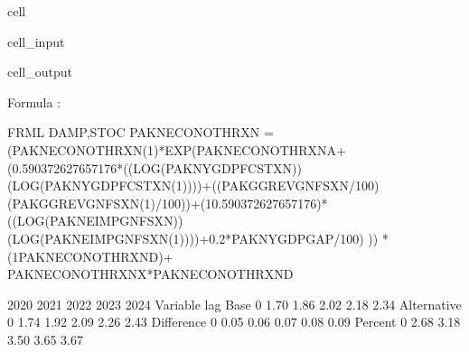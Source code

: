\documentclass[letterpaper,10pt,english]{jupyterBook}
\begin{document}
\begin{sphinxuseclass}{cell}\begin{sphinxVerbatimInput}

\begin{sphinxuseclass}{cell_input}
\begin{sphinxVerbatim}[commandchars=\\\{\}]
\PYG{p}{[}\PYG{p}{]}
\end{sphinxVerbatim}

\end{sphinxuseclass}\end{sphinxVerbatimInput}
\begin{sphinxVerbatimOutput}

\begin{sphinxuseclass}{cell_output}
\begin{sphinxVerbatim}[commandchars=\\\{\}]
Formula        :
\end{sphinxVerbatim}

\begin{sphinxVerbatim}[commandchars=\\\{\}]
 FRML \PYGZlt{}DAMP,STOC\PYGZgt{} PAKNECONOTHRXN = (PAKNECONOTHRXN(\PYGZhy{}1)*EXP(PAKNECONOTHRXN\PYGZus{}A+ (0.590372627657176*((LOG(PAKNYGDPFCSTXN))\PYGZhy{}(LOG(PAKNYGDPFCSTXN(\PYGZhy{}1))))+((PAKGGREVGNFSXN/100)\PYGZhy{}(PAKGGREVGNFSXN(\PYGZhy{}1)/100))+(1\PYGZhy{}0.590372627657176)*((LOG(PAKNEIMPGNFSXN))\PYGZhy{}(LOG(PAKNEIMPGNFSXN(\PYGZhy{}1))))+0.2*PAKNYGDPGAP\PYGZus{}/100) )) * (1\PYGZhy{}PAKNECONOTHRXN\PYGZus{}D)+ PAKNECONOTHRXN\PYGZus{}X*PAKNECONOTHRXN\PYGZus{}D  \PYGZdl{} 

                      2020       2021       2022       2023       2024
Variable    lag                                                       
Base        0         1.70       1.86       2.02       2.18       2.34
Alternative 0         1.74       1.92       2.09       2.26       2.43
Difference  0         0.05       0.06       0.07       0.08       0.09
Percent     0         2.68       3.18       3.50       3.65       3.67


\end{sphinxVerbatim}
\end{sphinxuseclass}
\end{sphinxVerbatimOutput}
\end{sphinxuseclass}
\end{document}
